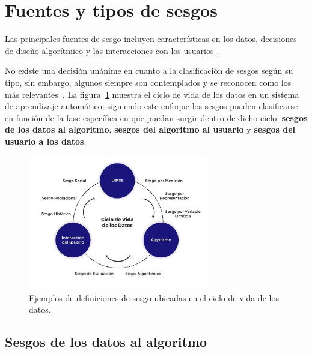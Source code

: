\section{Fuentes y tipos de sesgos}

    Las principales fuentes de sesgo incluyen caracter\'isticas en los datos, decisiones de dise\~no algor\'itmico y las interacciones 
    con los usuarios~\parencite{resp_data}.
    
    No existe una decisi\'on un\'anime en cuanto a la clasificaci\'on de sesgos seg\'un su tipo, sin embargo, 
    algunos siempre son contemplados y se reconocen como los m\'as relevantes~\parencite{survey}. La figura~\ref{fig:cycle} 
    muestra el ciclo de vida de los datos en un sistema de aprendizaje autom\'atico; siguiendo este enfoque los sesgos pueden 
    clasificarse en funci\'on de la fase espec\'ifica en que puedan surgir dentro de dicho ciclo: 
    \textbf{sesgos de los datos al algoritmo}, \textbf{sesgos del algoritmo al usuario} y \textbf{sesgos del usuario a los datos}.

    \begin{figure}[htpb]
        \begin{center}
            \includegraphics[width=0.7\textwidth]{Graphics/data_cycle.png}
        \end{center}
        \caption{Ejemplos de definiciones de sesgo ubicadas en el ciclo de vida de los datos.}
        \label{fig:cycle}
    \end{figure}
    

    \subsection{Sesgos de los datos al algoritmo}
    
